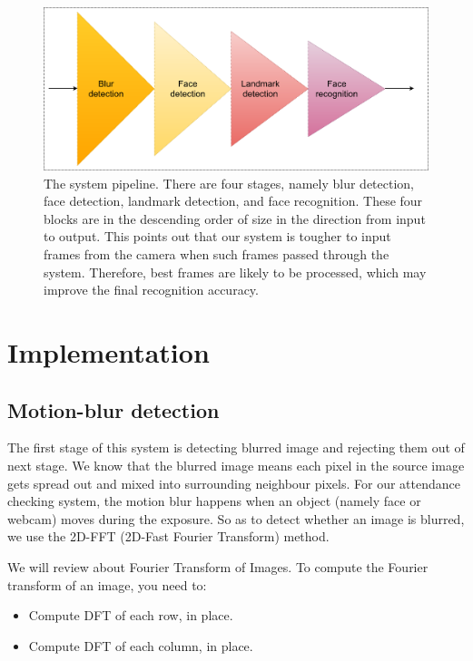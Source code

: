 \documentclass[journal, twocolumn]{IEEEtran}
\begin{document}
\begin{figure}
    \centering
    \includegraphics[width=\linewidth]{img/system-pipeline.png}
	\caption{The system pipeline. There are four stages, namely blur detection, face detection, landmark detection, and face recognition. These four blocks are in the descending order of size in the direction from input to output. This points out that our system is tougher to input frames from the camera when such frames passed through the system. Therefore, best frames are likely to be processed, which may improve the final recognition accuracy.}\label{fig:system}
\end{figure}


\medskip
\section{Implementation}
\label{implementation}


\subsection{Motion-blur detection}
\label{motion-blur-detection}

The first stage of this system is detecting blurred image and rejecting them out of next stage. We know that the blurred image means each pixel in the source image gets spread out and mixed into surrounding neighbour pixels. For our attendance checking system, the motion blur happens when an object (namely face or webcam) moves during the exposure. So as to detect whether an image is blurred, we use the 2D-FFT (2D-Fast Fourier Transform) method.

 We will review about Fourier Transform of Images. To compute the Fourier transform of an image, you need to:
\begin{itemize}
\item Compute DFT of each row, in place.
\item Compute DFT of each column, in place.
\end{itemize}  
\end{document}
